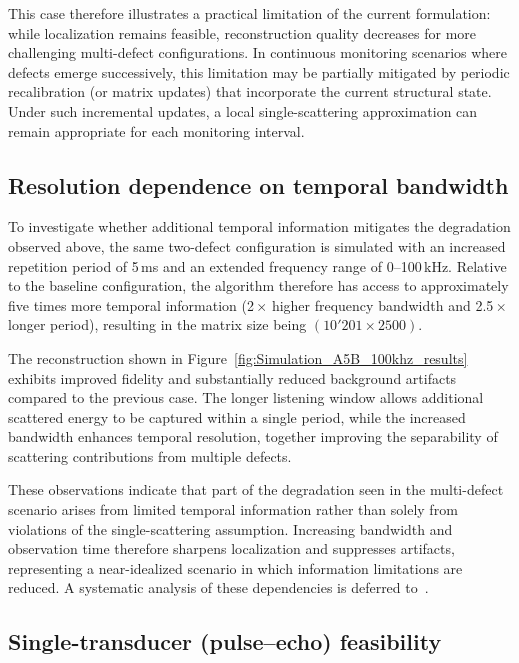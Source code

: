 \documentclass[a4paper,fleqn]{cas-sc}
\begin{document}
This case therefore illustrates a practical limitation of the current formulation: while localization remains feasible, reconstruction quality decreases for more challenging multi-defect configurations. In continuous monitoring scenarios where defects emerge successively, this limitation may be partially mitigated by periodic recalibration (or matrix updates) that incorporate the current structural state. Under such incremental updates, a local single-scattering approximation can remain appropriate for each monitoring interval.

\subsection{Resolution dependence on temporal bandwidth}\label{Results_Bandwidth}

To investigate whether additional temporal information mitigates the degradation observed above, the same two-defect configuration is simulated with an increased repetition period of 5\,ms and an extended frequency range of 0--100\,kHz. Relative to the baseline configuration, the algorithm therefore has access to approximately five times more temporal information (2\,$\times$ higher frequency bandwidth and 2.5\,$\times$ longer period), resulting in the matrix size being $(10'201 \times 2500)$.

The reconstruction shown in Figure~\ref{fig:Simulation_A5B_100khz_results} exhibits improved fidelity and substantially reduced background artifacts compared to the previous case. The longer listening window allows additional scattered energy to be captured within a single period, while the increased bandwidth enhances temporal resolution, together improving the separability of scattering contributions from multiple defects.

These observations indicate that part of the degradation seen in the multi-defect scenario arises from limited temporal information rather than solely from violations of the single-scattering assumption. Increasing bandwidth and observation time therefore sharpens localization and suppresses artifacts, representing a near-idealized scenario in which information limitations are reduced. A systematic analysis of these dependencies is deferred to~\cite{WueestMScThesis}.

\subsection{Single-transducer (pulse--echo) feasibility}\label{Results_ECHO}
\end{document}
